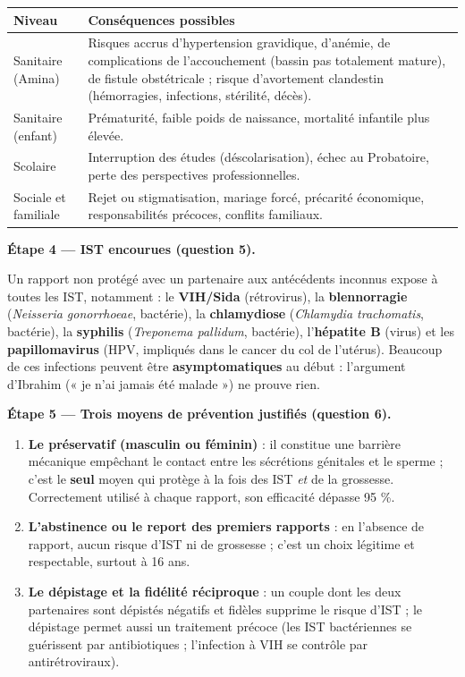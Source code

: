 \documentclass[11pt]{article}
\newcommand{\cle}[1]{{\popxbold\color{popdark}#1}}
\begin{document}
\begin{exoresolu}
\begin{center}
\begin{tabularx}{\linewidth}{|l|X|}\hline
\rowcolor{popblueL} \textbf{Niveau} & \textbf{Conséquences possibles} \\ \hline
Sanitaire (Amina) & Risques accrus d'hypertension gravidique, d'anémie, de complications de l'accouchement (bassin pas totalement mature), de fistule obstétricale ; risque d'avortement clandestin (hémorragies, infections, stérilité, décès). \\ \hline
Sanitaire (enfant) & Prématurité, faible poids de naissance, mortalité infantile plus élevée. \\ \hline
Scolaire & Interruption des études (déscolarisation), échec au Probatoire, perte des perspectives professionnelles. \\ \hline
Sociale et familiale & Rejet ou stigmatisation, mariage forcé, précarité économique, responsabilités précoces, conflits familiaux. \\ \hline
\end{tabularx}
\end{center}

\textbf{Étape 4 — IST encourues (question 5).}

Un rapport non protégé avec un partenaire aux antécédents inconnus expose à toutes les IST, notamment : le \textbf{VIH/Sida} (rétrovirus), la \textbf{blennorragie} (\emph{Neisseria gonorrhoeae}, bactérie), la \textbf{chlamydiose} (\emph{Chlamydia trachomatis}, bactérie), la \textbf{syphilis} (\emph{Treponema pallidum}, bactérie), l'\textbf{hépatite B} (virus) et les \textbf{papillomavirus} (HPV, impliqués dans le cancer du col de l'utérus). Beaucoup de ces infections peuvent être \textbf{asymptomatiques} au début : l'argument d'Ibrahim (« je n'ai jamais été malade ») ne prouve rien.

\textbf{Étape 5 — Trois moyens de prévention justifiés (question 6).}

\begin{enumerate}
\item \textbf{Le préservatif (masculin ou féminin)} : il constitue une \cle{barrière mécanique} empêchant le contact entre les sécrétions génitales et le sperme ; c'est le \textbf{seul} moyen qui protège à la fois des IST \emph{et} de la grossesse. Correctement utilisé à chaque rapport, son efficacité dépasse 95 \%.
\item \textbf{L'abstinence ou le report des premiers rapports} : en l'absence de rapport, aucun risque d'IST ni de grossesse ; c'est un choix légitime et respectable, surtout à 16 ans.
\item \textbf{Le dépistage et la fidélité réciproque} : un couple dont les deux partenaires sont dépistés négatifs et fidèles supprime le risque d'IST ; le dépistage permet aussi un traitement précoce (les IST bactériennes se guérissent par antibiotiques ; l'infection à VIH se contrôle par antirétroviraux).
\end{enumerate}


\end{exoresolu}
\end{document}

